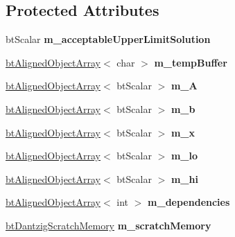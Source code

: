 \subsection*{Protected Attributes}
\begin{DoxyCompactItemize}
\item 
\mbox{\label{classbtDantzigSolver_aa6598890a5f1aa8661e986af9dc56ac7}} 
bt\+Scalar {\bfseries m\+\_\+acceptable\+Upper\+Limit\+Solution}
\item 
\mbox{\label{classbtDantzigSolver_a26e3843c879635311d5d34800cc023eb}} 
\hyperlink{classbtAlignedObjectArray}{bt\+Aligned\+Object\+Array}$<$ char $>$ {\bfseries m\+\_\+temp\+Buffer}
\item 
\mbox{\label{classbtDantzigSolver_aec8f1d2bfa12a3b872998acbbe268493}} 
\hyperlink{classbtAlignedObjectArray}{bt\+Aligned\+Object\+Array}$<$ bt\+Scalar $>$ {\bfseries m\+\_\+A}
\item 
\mbox{\label{classbtDantzigSolver_af6b70abce9079f5ecc9a87377df23860}} 
\hyperlink{classbtAlignedObjectArray}{bt\+Aligned\+Object\+Array}$<$ bt\+Scalar $>$ {\bfseries m\+\_\+b}
\item 
\mbox{\label{classbtDantzigSolver_af2c20a2fea3c79b293c112155380b627}} 
\hyperlink{classbtAlignedObjectArray}{bt\+Aligned\+Object\+Array}$<$ bt\+Scalar $>$ {\bfseries m\+\_\+x}
\item 
\mbox{\label{classbtDantzigSolver_aee283de892160f75836dca804430ed0b}} 
\hyperlink{classbtAlignedObjectArray}{bt\+Aligned\+Object\+Array}$<$ bt\+Scalar $>$ {\bfseries m\+\_\+lo}
\item 
\mbox{\label{classbtDantzigSolver_a92d361ade8daac56537da41d94272721}} 
\hyperlink{classbtAlignedObjectArray}{bt\+Aligned\+Object\+Array}$<$ bt\+Scalar $>$ {\bfseries m\+\_\+hi}
\item 
\mbox{\label{classbtDantzigSolver_aaebea1b9724e345055464cc5bcd25bf5}} 
\hyperlink{classbtAlignedObjectArray}{bt\+Aligned\+Object\+Array}$<$ int $>$ {\bfseries m\+\_\+dependencies}
\item 
\mbox{\label{classbtDantzigSolver_a8a3d108d7d813d89976f41861de7f3e4}} 
\hyperlink{structbtDantzigScratchMemory}{bt\+Dantzig\+Scratch\+Memory} {\bfseries m\+\_\+scratch\+Memory}
\end{DoxyCompactItemize}


